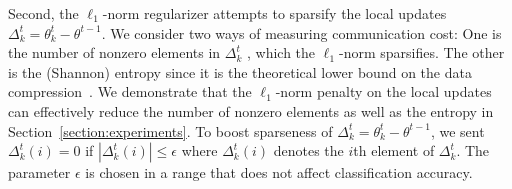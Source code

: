 \documentclass{article} %
\begin{document}



Second, the $\ell_1$-norm regularizer attempts to sparsify the local updates $\Delta_k^t = \theta_k^t - \theta^{t-1}$. We consider two ways of measuring communication cost: One is the number of nonzero elements in $\Delta_k^t$ \citep{Yoon2021federated,Jeong2021federated}, which the $\ell_1$-norm sparsifies. The other is the (Shannon) entropy since it is the theoretical lower bound on the data compression~\citep{Cover2006elements}. We demonstrate that the $\ell_1$-norm penalty on the local updates can effectively reduce the number of nonzero elements as well as the entropy in Section~\ref{section:experiments}. To boost sparseness of $\Delta_k^t=\theta_k^t - \theta^{t-1}$, we sent $\Delta_k^t(i) = 0$ if $|\Delta_k^t(i)| \le \epsilon$ where $\Delta_k^t(i)$ denotes the $i$th element of $\Delta_k^t$. The parameter $\epsilon$ is chosen in a range that does not affect classification accuracy. 

\end{document}
